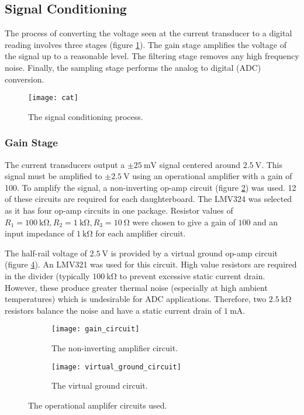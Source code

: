 \subsection{Signal Conditioning}

The process of converting the voltage seen at the current transducer to a digital reading involves three stages (figure \ref{fig:conditioning}).
The gain stage amplifies the voltage of the signal up to a reasonable level.
The filtering stage removes any high frequency noise.
Finally, the sampling stage performs the analog to digital (ADC) conversion.
\begin{figure}[H]
	\centering
	\texttt{[image: cat]}
	\caption{The signal conditioning process.}
	\label{fig:conditioning}
\end{figure}

\subsubsection{Gain Stage}

The current transducers output a $\pm \SI{25}{\milli\volt}$ signal centered around $\SI{2.5}{\volt}$.
This signal must be amplified to $\pm \SI{2.5}{\volt}$ using an operational amplifier with a gain of 100.
To amplify the signal, a non-inverting op-amp circuit (figure \ref{fig:non-inverting-op-amp}) was used.
12 of these circuits are required for each daughterboard.
The LMV324 was selected as it has four op-amp circuits in one package.
Resistor values of $R_1 = \SI{100}{\kilo\ohm}, R_2 = \SI{1}{\kilo\ohm}, R_3 = \SI{10}{\ohm}$ were chosen to give a gain of $100$ and an input impedance of $\SI{1}{\kilo\ohm}$ for each amplifier circuit.

The half-rail voltage of $\SI{2.5}{\volt}$ is provided by a virtual ground op-amp circuit (figure \ref{fig:half-supply}).
An LMV321 was used for this circuit.
High value resistors are required in the divider (typically $\SI{100}{\kilo\ohm}$ to prevent excessive static current drain.
However, these produce greater thermal noise (especially at high ambient temperatures) which is undesirable for ADC applications.
Therefore, two $\SI{2.5}{\kilo\ohm}$ resistors balance the noise and have a static current drain of $\SI{1}{\milli\ampere}$.

\begin{figure}[ht]
\centering

\begin{subfigure}[c]{0.45\textwidth}
	\centering
	\texttt{[image: gain\_circuit]}
	\caption{The non-inverting amplifier circuit.}
	\label{fig:non-inverting-op-amp}
\end{subfigure}
\hfill
\begin{subfigure}[c]{0.45\textwidth}
	\centering
	\vfill
	\texttt{[image: virtual\_ground\_circuit]}
	\vfill
	\caption{The virtual ground circuit.}
	\label{fig:half-supply}
\end{subfigure}

\caption{The operational amplifer circuits used.}
\end{figure}

